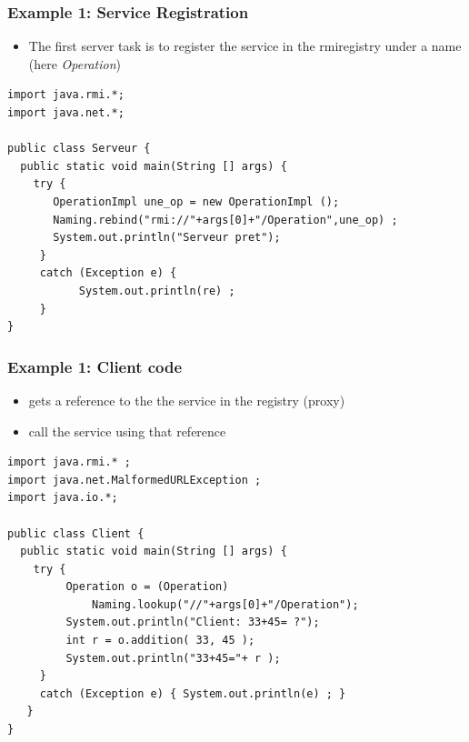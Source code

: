 \documentclass[bigger,hyperref={colorlinks=true, urlcolor=red, plainpages=false, pdfpagelabels, bookmarksnumbered}]{beamer}
\begin{document}
\begin{frame}[fragile]
\frametitle{Example 1: Service Registration}
\label{sec-3-10}

\begin{itemize}
\item The first server task is to register the service 
  in the rmiregistry under a name (here \emph{Operation})
\end{itemize}

\lstset{language=java}
\begin{lstlisting}
import java.rmi.*;
import java.net.*;

public class Serveur {
  public static void main(String [] args) {
    try {
       OperationImpl une_op = new OperationImpl ();
       Naming.rebind("rmi://"+args[0]+"/Operation",une_op) ;
       System.out.println("Serveur pret");
     }
     catch (Exception e) { 
           System.out.println(re) ; 
     }
}
\end{lstlisting}
\end{frame}
\begin{frame}[fragile]
\frametitle{Example 1: Client code}
\label{sec-3-11}

\begin{itemize}
\item gets a reference to the  the service in the registry (proxy)
\item call the service using that reference
\end{itemize}


\lstset{language=java}
\begin{lstlisting}
import java.rmi.* ;
import java.net.MalformedURLException ;
import java.io.*;

public class Client {
  public static void main(String [] args) {
    try {
         Operation o = (Operation) 
             Naming.lookup("//"+args[0]+"/Operation");
         System.out.println("Client: 33+45= ?");
         int r = o.addition( 33, 45 );
         System.out.println("33+45="+ r );
     }
     catch (Exception e) { System.out.println(e) ; }
   }
}
\end{lstlisting}
\end{frame}
\end{document}
